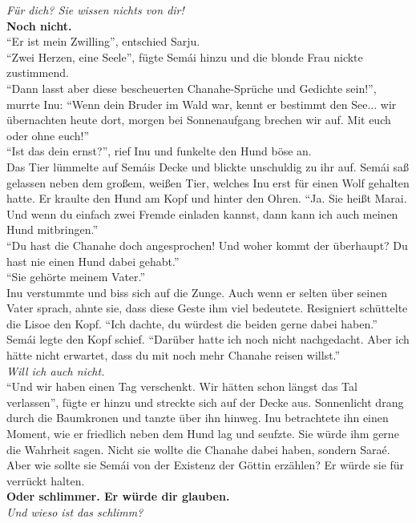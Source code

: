 \textit{Für dich? Sie wissen nichts von dir!}\\
\textbf{Noch nicht.}\\
``Er ist mein Zwilling'', entschied Sarju.\\
``Zwei Herzen, eine Seele'', fügte Semái hinzu und die blonde Frau nickte zustimmend.\\
``Dann lasst aber diese bescheuerten Chanahe-Sprüche und Gedichte sein!'', murrte Inu: ``Wenn dein 
Bruder im Wald war, kennt er bestimmt den See... wir übernachten heute dort, morgen bei 
Sonnenaufgang brechen wir auf. Mit euch oder ohne euch!''\\


``Ist das dein ernst?'', rief Inu und funkelte den Hund böse an. \\
Das Tier lümmelte auf Semáis Decke und blickte unschuldig zu ihr auf. Semái saß gelassen neben dem 
großem, weißen Tier, welches Inu erst für einen Wolf gehalten hatte. Er kraulte den Hund am Kopf 
und hinter den Ohren. ``Ja. Sie heißt Marai. Und wenn du einfach zwei Fremde einladen kannst, dann 
kann ich auch meinen Hund mitbringen.''\\
``Du hast die Chanahe doch angesprochen! Und woher kommt der überhaupt? Du hast nie einen Hund 
dabei gehabt.''\\
``Sie gehörte meinem Vater.''\\
Inu verstummte und biss sich auf die Zunge. Auch wenn er selten über seinen Vater sprach, ahnte 
sie, dass diese Geste ihm viel bedeutete. Resigniert schüttelte die Lisoe den Kopf. ``Ich 
dachte, du würdest die beiden gerne dabei haben.''\\
Semái legte den Kopf schief. ``Darüber hatte ich noch nicht nachgedacht. Aber ich hätte nicht 
erwartet, dass du mit noch mehr Chanahe reisen willst.''\\
\textit{Will ich auch nicht.}\\
``Und wir haben einen Tag verschenkt. Wir hätten schon längst das Tal verlassen'', fügte er hinzu 
und streckte sich auf der Decke aus. Sonnenlicht drang durch die Baumkronen und tanzte über ihn 
hinweg. Inu betrachtete ihn einen Moment, wie er friedlich neben dem Hund lag und seufzte. Sie 
würde ihm gerne die Wahrheit sagen. Nicht sie wollte die Chanahe dabei haben, sondern Saraé. Aber 
wie sollte sie Semái von der Existenz der Göttin erzählen? Er würde sie für verrückt halten.\\
\textbf{Oder schlimmer. Er würde dir glauben.}\\
\textit{Und wieso ist das schlimm?}\\
